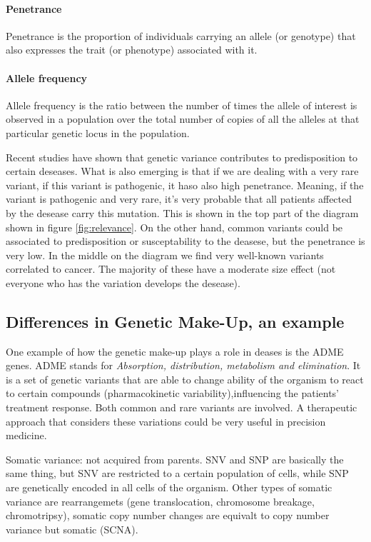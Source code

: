 \paragraph{Penetrance}
Penetrance is the proportion of individuals carrying an allele (or genotype) that also expresses the trait (or phenotype) associated with it.

\paragraph{Allele frequency}
Allele frequency is the ratio between the number of times the allele of interest is observed in a population over the total number of copies of all the alleles at that particular genetic locus in the population.
			
Recent studies have shown that genetic variance contributes to predisposition to certain deseases. 
What is also emerging is that if we are dealing with a very rare variant, if this variant is pathogenic, it haso also high penetrance.
Meaning, if the variant is pathogenic and very rare, it's very probable that all patients affected by the desease carry this mutation. This is shown in the top part of the diagram shown in figure \ref{fig:relevance}.
On the other hand, common variants could be associated to predisposition or susceptability to the deasese, but the penetrance is very low. 
In the middle on the diagram we find very well-known variants correlated to cancer. The majority of these have a moderate size effect (not everyone who has the variation develops the desease).

\subsection{Differences in Genetic Make-Up, an example}
One example of how the genetic make-up plays a role in deases is the ADME genes. 
ADME stands for \textit{Absorption, distribution, metabolism and elimination}. 
It is a set of genetic variants that are able to change ability of the organism to react to certain compounds (pharmacokinetic variability),influencing the patients’ treatment response.
Both common and rare variants are involved.
A therapeutic approach that considers these variations could be very useful in precision medicine.

Somatic variance: not acquired from parents. SNV and SNP are basically the same thing, but SNV are restricted to a certain population of cells, while SNP are genetically encoded in all cells of the organism. Other types of somatic variance are rearrangemets (gene translocation, chromosome breakage, chromotripsy), somatic copy number changes are equivalt to copy number variance but somatic (SCNA). 

